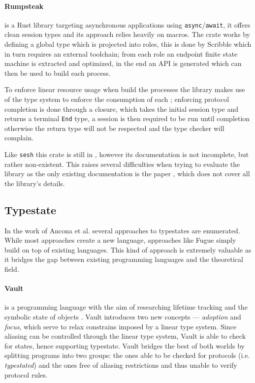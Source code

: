 \paragraph{Rumpsteak} \autocite{Cutner2021} is a Rust library targeting asynchronous applications using \texttt{async}/\texttt{await},
it offers clean session types and its approach relies heavily on macros.
The crate works by defining a global type which is projected into roles,
this is done by Scribble which in turn requires an external toolchain;
from each role an endpoint finite state machine is extracted and optimized,
in the end an \gls{API} is generated which can then be used to build each process.

To enforce linear resource usage when build the processes
the library makes use of the type system to enforce the consumption of each ;
enforcing protocol completion is done through a closure,
which takes the initial session type and returns a terminal \texttt{End} type,
a session is then required to be run until completion otherwise the return type will not be respected and the type checker will complain.

Like \texttt{sesh} this crate is still in ,
however its documentation is not incomplete, but rather non-existent.
This raises several difficulties when trying to evaluate the library as the only existing documentation is the paper \autocite{Cutner2021},
which does not cover all the library's details.

\subsection{Typestate}
In the work of Ancona et al. \autocite[Section 2.3]{Ancona2016} several approaches to typestates are enumerated.
While most approaches create a new language,
approaches like Fugue \autocite{DeLine2004} simply build on top of existing languages.
This kind of approach is extremely valuable as it bridges the gap between existing programming languages and the theoretical field.

\paragraph{Vault} is a programming language with the aim of researching lifetime tracking and the symbolic state of objects \autocite{Fahndrich2002}.
Vault introduces two new concepts — \emph{adoption} and \emph{focus}, which serve to relax constrains imposed by a linear type system.
Since aliasing can be controlled through the linear type system, Vault is able to check for states, hence supporting typestate.
Vault bridges the best of both worlds by splitting programs into two groups:
the ones able to be checked for protocols (i.e. \emph{typestated}) and
the ones free of aliasing restrictions and thus unable to verify protocol rules.

